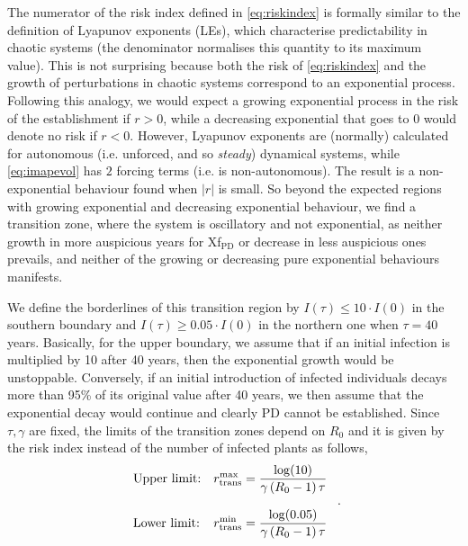 The numerator of the risk index defined in \cref{eq:riskindex} is formally
similar to the definition of Lyapunov exponents (LEs), which characterise
predictability in chaotic systems (the denominator normalises this quantity to
its maximum value). This is not surprising because both the risk of
\cref{eq:riskindex} and the growth of perturbations in chaotic systems
correspond to an exponential process.
Following this analogy, we would expect a growing exponential process in
the risk of the establishment if $r>0$, while a decreasing exponential that
goes to $0$ would denote no risk if $r<0$.
However, Lyapunov exponents are (normally) calculated for autonomous (i.e.
unforced, and so \textit{steady}) dynamical systems, while \cref{eq:imapevol}
has $2$ forcing terms (i.e. is non-autonomous).
The result is a non-exponential behaviour found when $|r|$ is small. So
beyond the expected regions with growing exponential and decreasing exponential
behaviour, we find a transition zone, where the system is oscillatory and not
exponential, as neither growth in more auspicious years for Xf$_{\textrm{PD}}$
or decrease in less auspicious ones prevails, and neither of the growing or
decreasing pure exponential behaviours manifests.

We define the borderlines of this transition region by $I(\tau)\leq10 \cdot
    I(0)$ in the southern boundary and $I(\tau)\geq 0.05 \cdot I(0)$ in the
northern one when $\tau=40$ years. Basically, for the upper boundary, we assume
that if an initial infection is multiplied by 10 after 40 years, then the
exponential growth would be unstoppable. Conversely, if an initial introduction
of infected individuals decays more than 95\% of its original value after 40
years, we then assume that the exponential decay would continue and clearly PD
cannot be established. Since $\tau, \gamma$ are fixed, the limits of the
transition zones depend on $R_0 $ and it is given by the risk index instead of
the number of infected plants as follows,
\begin{equation}
    \begin{array}{ll}
        \displaystyle \textrm{Upper limit:} & \displaystyle

        r_{\textrm{trans}}^{\textrm{max}}=\frac{\log(10)}{\gamma\left(R_0-1\right)\tau}
        \\\\
        \displaystyle \textrm{Lower limit:} & \displaystyle

        r_{\textrm{trans}}^{\textrm{min}}=\frac{\log(0.05)}{\gamma\left(R_0-1\right)\tau}
    \end{array} \ .
\end{equation}

